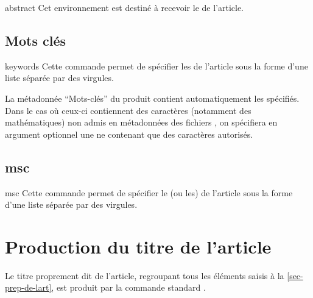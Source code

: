 \documentclass[english,nolocaltoc]{nwejmart}
\newtheorem[style=definition]{fait}
\newtheorem[title=expérience]{experience}
\newtheorem[title-plural=anneaux]{anneau}
\newtheorem[title=idéal,title-plural=idéaux]{ideal}
\begin{document}
\begin{docEnvironment}[doc description=\mandatory,doclang/environment content=résumé]{abstract}{}
  Cet environnement est destiné à recevoir le  de l'article.
\end{docEnvironment}

\subsection{Mots clés}

\begin{docCommand}[doc description=\mandatory]{keywords}{}
  Cette commande permet de spécifier les  de l'article sous la
  forme d'une liste séparée par des virgules.

  La métadonnée \enquote{Mots-clés} du  produit contient
  automatiquement les  spécifiés.  Dans le cas où ceux-ci
  contiennent des caractères (notamment des mathématiques) non admis en
  métadonnées des fichiers  , on spécifiera en argument optionnel une
   ne contenant que des caractères autorisés.
\end{docCommand}

\begin{bodycode}[listing options={deletekeywords={[5]keywords}}]
\end{bodycode}

\subsection{\texorpdfstring{\acrfull{msc}}{MSC}}

\begin{docCommand}[doc description=\mandatory]{msc}{}
  Cette commande permet de spécifier le (ou les)  de
  l'article sous la forme d'une liste séparée par des virgules.
\end{docCommand}

\section{Production du titre de l'article}
\label{sec-creation-du-titre}

Le titre proprement dit de l'article, regroupant tous les éléments saisis à la
\vref{sec-prep-de-lart}, est produit par la commande standard
.
\end{document}
